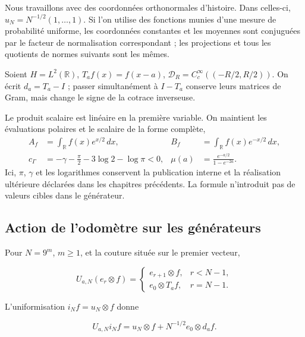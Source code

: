 Nous travaillons avec des coordonnées orthonormales d'histoire. Dans celles-ci, \(u_N=N^{-1/2}(1,\ldots,1)\). Si l'on utilise des fonctions munies d'une mesure de probabilité uniforme, les coordonnées constantes et les moyennes sont conjuguées par le facteur de normalisation correspondant ; les projections et tous les quotients de normes suivants sont les mêmes.

Soient \(H=L^2(\mathbb R)\), \(T_af(x)=f(x-a)\), \(\mathcal D_R=C_c^\infty((-R/2,R/2))\). On écrit \(d_a=T_a-I\) ; passer simultanément à \(I-T_a\) conserve leurs matrices de Gram, mais change le signe de la cotrace inverseuse.

Le produit scalaire est linéaire en la première variable. On maintient les évaluations polaires et le scalaire de la forme complète,
\begin{equation}
\begin{aligned}
A_f&=\int_{\mathbb R}f(x)e^{x/2}\,dx,
&B_f&=\int_{\mathbb R}f(x)e^{-x/2}\,dx,\\
c_\Gamma&=-\gamma-\frac\pi2-3\log2-\log\pi<0,
&\mu(a)&=\frac{e^{-a/2}}{1-e^{-2a}}.
\end{aligned}
\label{viii:gamma-add-def-evaluaciones}
\end{equation}
Ici, \(\pi\), \(\gamma\) et les logarithmes conservent la publication
interne et la réalisation ultérieure déclarées dans les chapitres précédents.
La formule n'introduit pas de valeurs cibles dans le générateur.

\subsection{Action de l'odomètre sur les générateurs}
\label{viii:gamma-add-sub-47}

Pour \(N=9^m\), \(m\ge1\), et la couture située sur le premier vecteur,

\begin{equation}
U_{a,N}(e_r\otimes f)=
\begin{cases}
e_{r+1}\otimes f,&r<N-1,\\
e_0\otimes T_af,&r=N-1.
\end{cases}
\label{viii:gamma-add-display-1}
\end{equation}

L'uniformisation \(i_Nf=u_N\otimes f\) donne

\begin{equation}
U_{a,N}i_Nf
=u_N\otimes f+N^{-1/2}e_0\otimes d_af.
\label{viii:gamma-add-display-2}
\end{equation}

